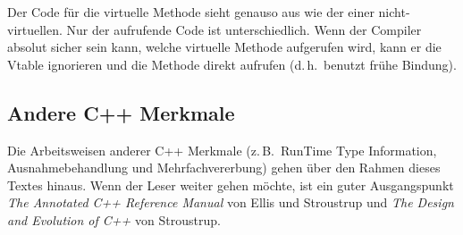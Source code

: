 Der Code f\"{u}r die virtuelle Methode sieht genauso aus wie der einer
nicht-virtuellen. Nur der aufrufende Code ist unterschiedlich. Wenn
der Compiler absolut sicher sein kann, welche virtuelle Methode
aufgerufen wird, kann er die Vtable ignorieren und die Methode
direkt aufrufen (d.\,h.\ benutzt fr\"{u}he Bindung).
 
 
 

\subsection{Andere C++ Merkmale}

Die Arbeitsweisen anderer C++ Merkmale (z.\,B.\ RunTime Type
Information, Ausnahmebehandlung und Mehrfachvererbung) gehen \"{u}ber
den Rahmen dieses Textes hinaus. Wenn der Leser weiter gehen m\"{o}chte,
ist ein guter Ausgangspunkt \emph{The Annotated C++ Reference
Manual} von Ellis und Stroustrup und \emph{The Design and Evolution
of C++} von Stroustrup.
